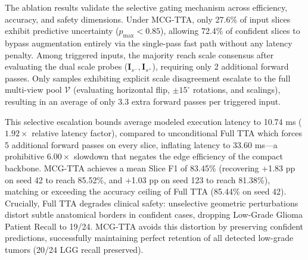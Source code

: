 \begin{table}[t]
\caption{Ablation of Test-Time Augmentation (TTA) Strategies on LS-Net (BraTS 2020)}\label{tab:ablation}
\centering\scriptsize
{}
\end{table}

The ablation results validate the selective gating mechanism across efficiency, accuracy, and safety dimensions. Under MCG-TTA, only 27.6\% of input slices exhibit predictive uncertainty ($p_{\max} < 0.85$), allowing 72.4\% of confident slices to bypass augmentation entirely via the single-pass fast path without any latency penalty. Among triggered inputs, the majority reach scale consensus after evaluating the dual scale probes ($\mathbf{I}_{s^-}, \mathbf{I}_{s^+}$), requiring only 2 additional forward passes. Only samples exhibiting explicit scale disagreement escalate to the full multi-view pool $\mathcal{V}$ (evaluating horizontal flip, $\pm 15^\circ$ rotations, and scalings), resulting in an average of only 3.3 extra forward passes per triggered input.

This selective escalation bounds average modeled execution latency to 10.74 ms ($1.92\times$ relative latency factor), compared to unconditional Full TTA which forces 5 additional forward passes on every slice, inflating latency to 33.60 ms---a prohibitive $6.00\times$ slowdown that negates the edge efficiency of the compact backbone. MCG-TTA achieves a mean Slice F1 of 83.45\% (recovering +1.83 pp on seed 42 to reach 85.52\%, and +1.03 pp on seed 123 to reach 81.38\%), matching or exceeding the accuracy ceiling of Full TTA (85.44\% on seed 42). Crucially, Full TTA degrades clinical safety: unselective geometric perturbations distort subtle anatomical borders in confident cases, dropping Low-Grade Glioma Patient Recall to 19/24. MCG-TTA avoids this distortion by preserving confident predictions, successfully maintaining perfect retention of all detected low-grade tumors (20/24 LGG recall preserved).

